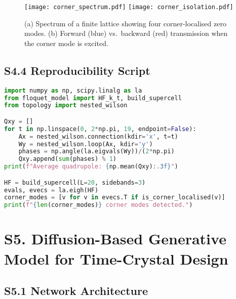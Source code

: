 \documentclass[11pt]{article}
\begin{document}
\begin{figure}[h]
  \centering
  \texttt{[image: corner\_spectrum.pdf]}\hfill
  \texttt{[image: corner\_isolation.pdf]}
  \caption{(a) Spectrum of a finite lattice showing four
  corner-localised zero modes. (b) Forward (blue) vs.\ backward (red)
  transmission when the corner mode is excited.}
  \label{fig:S4_corner}
\end{figure}

\subsection*{S4.4  Reproducibility Script}

\begin{lstlisting}[language=Python,caption={Python snippet that reproduces \(\overline{Q}_{xy}\) and the corner-state isolation.},label={lst:S4_py}]
import numpy as np, scipy.linalg as la
from floquet_model import HF_k_t, build_supercell
from topology import nested_wilson

Qxy = []
for t in np.linspace(0, 2*np.pi, 19, endpoint=False):
    Ax = nested_wilson.connection(kdir='x', t=t)
    Wy = nested_wilson.loop(Ax, kdir='y')
    phases = np.angle(la.eigvals(Wy))/(2*np.pi)
    Qxy.append(sum(phases) % 1)
print(f"Average quadrupole: {np.mean(Qxy):.3f}")

HF = build_supercell(L=20, sidebands=3)
evals, evecs = la.eigh(HF)
corner_modes = [v for v in evecs.T if is_corner_localised(v)]
print(f"{len(corner_modes)} corner modes detected.")
\end{lstlisting}
\section*{S5. Diffusion-Based Generative Model for Time-Crystal Design}
\label{sec:S5_ddpm}

\subsection*{S5.1  Network Architecture}
\end{document}
